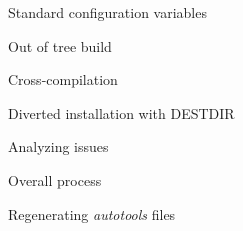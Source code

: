 \begin{frame}{Standard configuration variables}

\end{frame}

\begin{frame}{Out of tree build}

\end{frame}

\begin{frame}{Cross-compilation}

\end{frame}

\begin{frame}{Diverted installation with DESTDIR}

\end{frame}

\begin{frame}{Analyzing issues}

\end{frame}

\begin{frame}{Overall process}

\end{frame}

\begin{frame}{Regenerating {\em autotools} files}

\end{frame}
